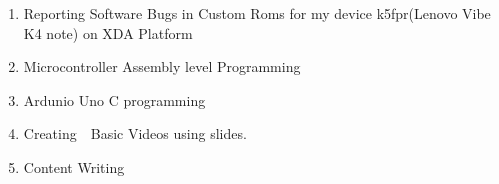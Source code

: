 \documentclass[12pt]{article}
\begin{document}
\begin{enumerate}
	\item {\fontsize{13pt}{15.6pt}\selectfont Reporting Software Bugs in Custom Roms for my device k5fpr(Lenovo Vibe K4 note) on XDA Platform\par}\par

	\item {\fontsize{13pt}{15.6pt} Microcontroller Assembly level Programming\par}\par

	\item {\fontsize{13pt}{15.6pt}\selectfont Ardunio Uno C programming\par}\par

	\item {\fontsize{13pt}{15.6pt}\selectfont Creating\ \ Basic Videos  using slides.\par}\par

	\item {\fontsize{13pt}{15.6pt}\selectfont Content Writing\par}
\end{enumerate}\par
\end{document}
